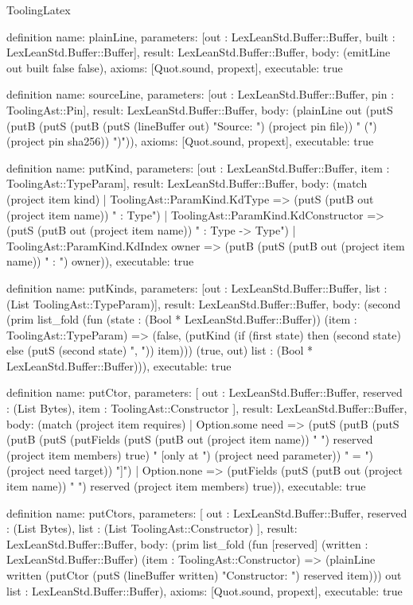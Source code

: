 \begin{lexlean}{ToolingLatex}
\begin{semanticmodule}
definition{
  name: plainLine,
  parameters: [out : LexLeanStd.Buffer::Buffer, built : LexLeanStd.Buffer::Buffer],
  result: LexLeanStd.Buffer::Buffer,
  body: (emitLine out built false false),
  axioms: [Quot.sound, propext],
  executable: true
}

definition{
  name: sourceLine,
  parameters: [out : LexLeanStd.Buffer::Buffer, pin : ToolingAst::Pin],
  result: LexLeanStd.Buffer::Buffer,
  body: (plainLine out (putS (putB (putS (putB (putS (lineBuffer out) "Source: ") (project pin file)) " (") (project pin sha256)) ")")),
  axioms: [Quot.sound, propext],
  executable: true
}

definition{
  name: putKind,
  parameters: [out : LexLeanStd.Buffer::Buffer, item : ToolingAst::TypeParam],
  result: LexLeanStd.Buffer::Buffer,
  body: (match (project item kind)
    | ToolingAst::ParamKind.KdType => (putS (putB out (project item name)) " : Type")
    | ToolingAst::ParamKind.KdConstructor => (putS (putB out (project item name)) " : Type -> Type")
    | ToolingAst::ParamKind.KdIndex owner => (putB (putS (putB out (project item name)) " : ") owner)),
  executable: true
}

definition{
  name: putKinds,
  parameters: [out : LexLeanStd.Buffer::Buffer, list : (List ToolingAst::TypeParam)],
  result: LexLeanStd.Buffer::Buffer,
  body: (second (prim list_fold (fun (state : (Bool * LexLeanStd.Buffer::Buffer)) (item : ToolingAst::TypeParam) => (false, (putKind (if (first state) then (second state) else (putS (second state) ", ")) item))) (true, out) list : (Bool * LexLeanStd.Buffer::Buffer))),
  executable: true
}

definition{
  name: putCtor,
  parameters: [
    out : LexLeanStd.Buffer::Buffer,
    reserved : (List Bytes),
    item : ToolingAst::Constructor
  ],
  result: LexLeanStd.Buffer::Buffer,
  body: (match (project item requires)
    | Option.some need => (putS (putB (putS (putB (putS (putFields (putS (putB out (project item name)) " ") reserved (project item members) true) " [only at ") (project need parameter)) " = ") (project need target)) "]")
    | Option.none => (putFields (putS (putB out (project item name)) " ") reserved (project item members) true)),
  executable: true
}

definition{
  name: putCtors,
  parameters: [
    out : LexLeanStd.Buffer::Buffer,
    reserved : (List Bytes),
    list : (List ToolingAst::Constructor)
  ],
  result: LexLeanStd.Buffer::Buffer,
  body: (prim list_fold (fun [reserved] (written : LexLeanStd.Buffer::Buffer) (item : ToolingAst::Constructor) => (plainLine written (putCtor (putS (lineBuffer written) "Constructor: ") reserved item))) out list : LexLeanStd.Buffer::Buffer),
  axioms: [Quot.sound, propext],
  executable: true
}


\end{semanticmodule}
\end{lexlean}

